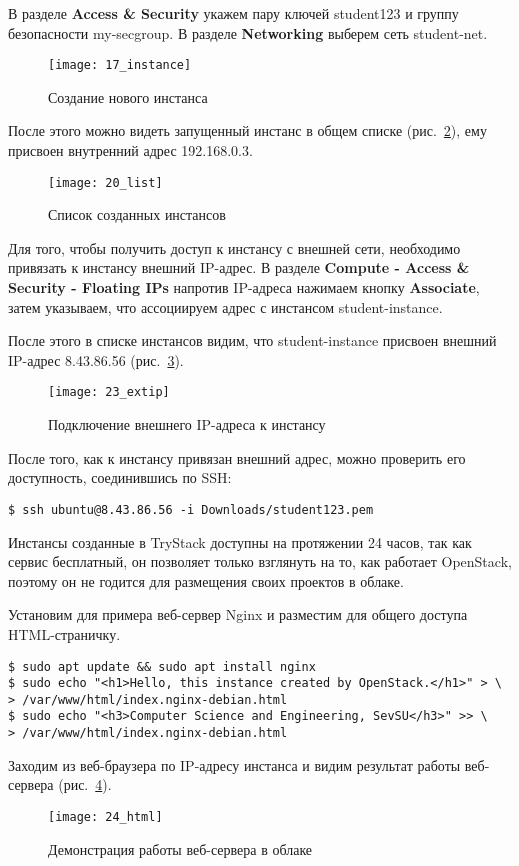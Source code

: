 В разделе \textbf{Access \& Security} укажем пару ключей student123 и группу безопасности my-secgroup.
В разделе \textbf{Networking} выберем сеть student-net.
\begin{figure}[ht]
    \centering
    \texttt{[image: 17\_instance]}
    \caption{Создание нового инстанса}\label{pic:instance}
\end{figure}

После этого можно видеть запущенный инстанс в общем списке (рис.~\ref{pic:list}), ему присвоен внутренний адрес 192.168.0.3.
\begin{figure}[ht]
    \centering
    \texttt{[image: 20\_list]}
    \caption{Список созданных инстансов}\label{pic:list}
\end{figure}

\clearpage

Для того, чтобы получить доступ к инстансу с внешней сети, необходимо привязать к инстансу внешний IP-адрес.
В разделе \textbf{Compute - Access \& Security - Floating IPs} напротив IP-адреса нажимаем кнопку \textbf{Associate}, затем указываем, что ассоциируем адрес с инстансом student-instance.

После этого в списке инстансов видим, что student-instance присвоен внешний IP-адрес 8.43.86.56 (рис.~\ref{pic:extip}).
\begin{figure}[ht]
    \centering
    \texttt{[image: 23\_extip]}
    \caption{Подключение внешнего IP-адреса к инстансу}\label{pic:extip}
\end{figure}

После того, как к инстансу привязан внешний адрес, можно проверить его доступность, соединившись по SSH:
\begin{lstlisting}
$ ssh ubuntu@8.43.86.56 -i Downloads/student123.pem
\end{lstlisting}

Инстансы созданные в TryStack доступны на протяжении 24 часов, так как сервис бесплатный, он позволяет только взглянуть на то, как работает OpenStack, поэтому он не годится для размещения своих проектов в облаке.

Установим для примера веб-сервер Nginx и разместим для общего доступа HTML-страничку.
\begin{lstlisting}
$ sudo apt update && sudo apt install nginx
$ sudo echo "<h1>Hello, this instance created by OpenStack.</h1>" > \
> /var/www/html/index.nginx-debian.html
$ sudo echo "<h3>Computer Science and Engineering, SevSU</h3>" >> \
> /var/www/html/index.nginx-debian.html
\end{lstlisting}

Заходим из веб-браузера по IP-адресу инстанса и видим результат работы веб-сервера (рис.~\ref{pic:html}).
\begin{figure}[ht]
    \centering
    \texttt{[image: 24\_html]}
    \caption{Демонстрация работы веб-сервера в облаке}\label{pic:html}
\end{figure}

\clearpage
